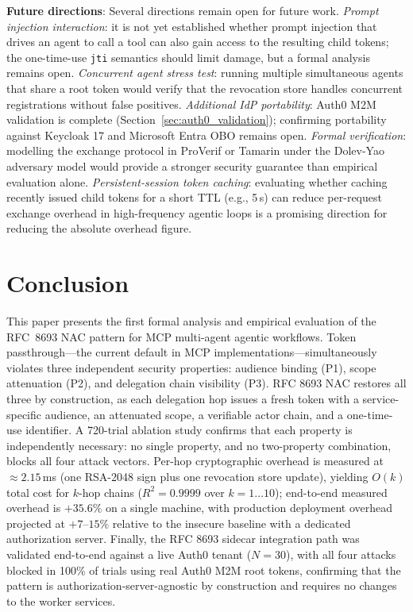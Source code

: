 \documentclass[journal]{IEEEtran}
\begin{document}
\textbf{Future directions}:
Several directions remain open for future work.
\textit{Prompt injection interaction}: it is not yet established whether prompt
injection that drives an agent to call a tool can also gain access to the
resulting child tokens; the one-time-use \texttt{jti} semantics should limit
damage, but a formal analysis remains open.
\textit{Concurrent agent stress test}: running multiple simultaneous agents that
share a root token would verify that the revocation store handles concurrent
registrations without false positives.
\textit{Additional IdP portability}: Auth0 M2M validation is complete
(Section~\ref{sec:auth0_validation}); confirming portability against Keycloak 17
and Microsoft Entra OBO remains open.
\textit{Formal verification}: modelling the exchange protocol in ProVerif
\cite{blanchet2001} or Tamarin \cite{meier2013} under the Dolev-Yao adversary
model would provide a stronger security guarantee than empirical evaluation alone.
\textit{Persistent-session token caching}: evaluating whether caching recently
issued child tokens for a short TTL (e.g., 5\,s) can reduce per-request exchange
overhead in high-frequency agentic loops is a promising direction for reducing
the absolute overhead figure.


\FloatBarrier  %

\section{Conclusion}
\label{sec:conclusion}

This paper presents the first formal analysis and empirical evaluation of the
RFC~8693 NAC pattern for MCP multi-agent agentic workflows. Token
passthrough---the current default in MCP implementations---simultaneously
violates three independent security properties: audience binding (P1), scope
attenuation (P2), and delegation chain visibility (P3). RFC 8693 NAC restores
all three by construction, as each delegation hop issues a fresh token with a
service-specific audience, an attenuated scope, a verifiable actor chain, and a
one-time-use identifier. A 720-trial ablation study confirms that each property
is independently necessary: no single property, and no two-property combination,
blocks all four attack vectors. Per-hop cryptographic overhead is measured at
$\approx 2.15$\,ms (one RSA-2048 sign plus one revocation store update),
yielding $O(k)$ total cost for $k$-hop chains ($R^2 = 0.9999$ over
$k=1\ldots10$); end-to-end measured overhead is $+35.6\%$ on a single machine,
with production deployment overhead projected at $+7$--$15\%$ relative to the
insecure baseline with a dedicated authorization server. Finally, the RFC 8693
sidecar integration path was validated end-to-end against a live Auth0 tenant
($N=30$), with all four attacks blocked in 100\% of trials using real Auth0 M2M
root tokens, confirming that the pattern is authorization-server-agnostic by
construction and requires no changes to the worker services.
\end{document}
